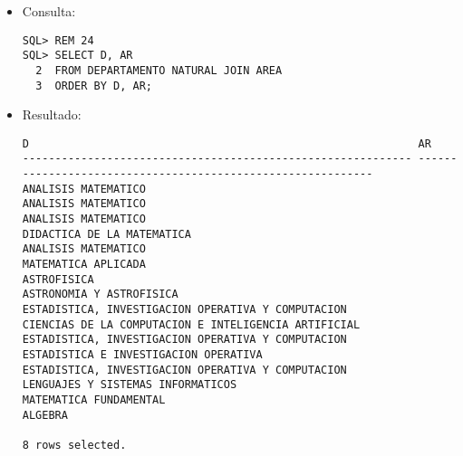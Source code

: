 \documentclass[11pt]{report}
\begin{document}
\begin{itemize}
  \item Consulta:
  \begin{verbatim}
SQL> REM 24
SQL> SELECT D, AR
  2  FROM DEPARTAMENTO NATURAL JOIN AREA
  3  ORDER BY D, AR;
  \end{verbatim}
  \item{Resultado:}
  \begin{verbatim}
D                                                            AR                                                                                                                     
------------------------------------------------------------ ------------------------------------------------------------                                                           
ANALISIS MATEMATICO                                          ANALISIS MATEMATICO                                                                                                    
ANALISIS MATEMATICO                                          DIDACTICA DE LA MATEMATICA                                                                                             
ANALISIS MATEMATICO                                          MATEMATICA APLICADA                                                                                                    
ASTROFISICA                                                  ASTRONOMIA Y ASTROFISICA                                                                                               
ESTADISTICA, INVESTIGACION OPERATIVA Y COMPUTACION           CIENCIAS DE LA COMPUTACION E INTELIGENCIA ARTIFICIAL                                                                   
ESTADISTICA, INVESTIGACION OPERATIVA Y COMPUTACION           ESTADISTICA E INVESTIGACION OPERATIVA                                                                                  
ESTADISTICA, INVESTIGACION OPERATIVA Y COMPUTACION           LENGUAJES Y SISTEMAS INFORMATICOS                                                                                      
MATEMATICA FUNDAMENTAL                                       ALGEBRA                                                                                                                

8 rows selected.
  \end{verbatim}
\end{itemize}

\newpage
\end{document}
